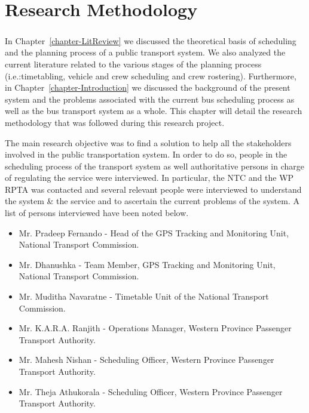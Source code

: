 
\chapter{Research Methodology}
\label{chapter-ResearchMethodology}

\paragraph{ } In Chapter~\ref{chapter-LitReview} we discussed the theoretical basis of scheduling and the planning process of a public transport system. We also analyzed the current literature related to the various stages of the planning process (i.e.:timetabling, vehicle and crew scheduling and crew rostering). Furthermore, in Chapter~\ref{chapter-Introduction} we discussed the background of the present system and the problems associated with the current bus scheduling process as well as the bus transport system as a whole. This chapter will detail the research methodology that was followed during this research project.

The main research objective was to find a solution to help all the stakeholders involved in the public transportation system. In order to do so, people in the scheduling process of the transport system as well authoritative persons in charge of regulating the service were interviewed. In particular, the NTC and the WP RPTA was contacted and several relevant people were interviewed to understand the system \& the service and to ascertain the current problems of the system. A list of persons interviewed have been noted below.

\begin{itemize}
\item Mr. Pradeep Fernando - Head of the GPS Tracking and Monitoring Unit, National Transport Commission.
\item Mr. Dhanushka - Team Member, GPS Tracking and Monitoring Unit, National Transport Commission.
\item Mr. Muditha Navaratne - Timetable Unit of the National Transport Commission.
\item Mr. K.A.R.A. Ranjith - Operations Manager, Western Province Passenger Transport Authority.
\item Mr. Mahesh Nishan - Scheduling Officer, Western Province Passenger Transport Authority.
\item Mr. Theja Athukorala - Scheduling Officer, Western Province Passenger Transport Authority.
\end{itemize}

